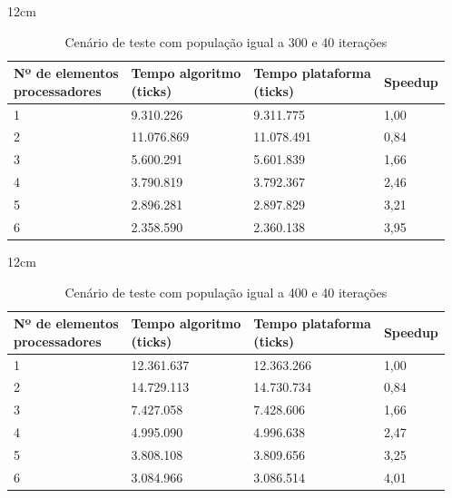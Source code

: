 \begin{table}[h]{12cm}
    \caption{Cenário de teste com população igual a 300 e 40 iterações}
    \label{tbl:taylor-vortex-parameters}
    \begin{tabular}{llll}
        \hline
        \shortstack[l]{Nº de elementos \\ processadores} & \shortstack[l]{Tempo algoritmo \\ (ticks)} & \shortstack[l]{Tempo plataforma \\ (ticks)} & Speedup \\
        \hline
        1 & 9.310.226  & 9.311.775  & 1,00 \\
        2 & 11.076.869 & 11.078.491 & 0,84 \\
        3 & 5.600.291  & 5.601.839  & 1,66 \\
        4 & 3.790.819  & 3.792.367  & 2,46 \\
        5 & 2.896.281  & 2.897.829  & 3,21 \\
        6 & 2.358.590  & 2.360.138  & 3,95 \\
        \hline
    \end{tabular}
\end{table}

\begin{table}[h]{12cm}
    \caption{Cenário de teste com população igual a 400 e 40 iterações}
    \label{tbl:taylor-vortex-parameters}
    \begin{tabular}{llll}
        \hline
        \shortstack[l]{Nº de elementos \\ processadores} & \shortstack[l]{Tempo algoritmo \\ (ticks)} & \shortstack[l]{Tempo plataforma \\ (ticks)} & Speedup \\
        \hline
        1 & 12.361.637 & 12.363.266 & 1,00 \\
        2 & 14.729.113 & 14.730.734 & 0,84 \\
        3 & 7.427.058  & 7.428.606  & 1,66 \\
        4 & 4.995.090  & 4.996.638  & 2,47 \\
        5 & 3.808.108  & 3.809.656  & 3,25 \\
        6 & 3.084.966  & 3.086.514  & 4,01 \\
        \hline
    \end{tabular}
\end{table}

